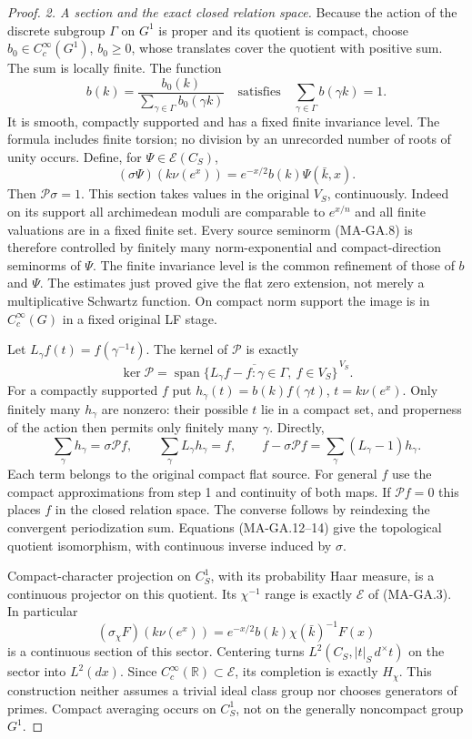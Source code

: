 \begin{proof}
\emph{2. A section and the exact closed relation space.}
Because the action of the discrete subgroup $\Gamma$ on
$G^1$ is proper and its quotient is compact, choose
$b_0\in C_c^\infty(G^1)$, $b_0\geq0$, whose translates
cover the quotient with positive sum.  The sum is locally
finite.  The function
\[
 b(k)=\frac{b_0(k)}{\sum_{\gamma\in\Gamma}b_0(\gamma k)}
 \quad\text{satisfies}\quad
       \sum_{\gamma\in\Gamma}b(\gamma k)=1.
 \tag{MA-GA.11}
\]
It is smooth, compactly supported and has a fixed finite
invariance level.  The formula includes finite torsion;
no division by an unrecorded number of roots of unity occurs.
Define, for $\Psi\in\mathcal E(C_S)$,
\[
 (\sigma\Psi)(k\nu(e^x))=e^{-x/2}b(k)\Psi(\bar k,x).
 \tag{MA-GA.12}
\]
Then $\mathcal P\sigma=1$.  This section takes values in
the original $V_S$, continuously.  Indeed on its support
all archimedean moduli are comparable to $e^{x/n}$ and all
finite valuations are in a fixed finite set.  Every source
seminorm (MA-GA.8) is therefore controlled by finitely many
norm-exponential and compact-direction seminorms of $\Psi$.
The finite invariance level is the common refinement of
those of $b$ and $\Psi$.  The estimates just proved give
the flat zero extension, not merely a multiplicative
Schwartz function.  On compact norm support the image is
in $C_c^\infty(G)$ in a fixed original LF stage.

Let $L_\gamma f(t)=f(\gamma^{-1}t)$.  The kernel of
$\mathcal P$ is exactly
\[
 \ker\mathcal P
     =\overline{\operatorname{span}
          \{L_\gamma f-f:\gamma\in\Gamma,\ f\in V_S\}}^{\,V_S}.
 \tag{MA-GA.13}
\]
For a compactly supported $f$ put
$h_\gamma(t)=b(k)f(\gamma t)$, $t=k\nu(e^x)$.
Only finitely many $h_\gamma$ are nonzero: their possible
$t$ lie in a compact set, and properness of the action
then permits only finitely many $\gamma$.  Directly,
\[
 \sum_\gamma h_\gamma=\sigma\mathcal P f,
 \qquad
 \sum_\gamma L_\gamma h_\gamma=f,
 \qquad
 f-\sigma\mathcal P f
          =\sum_\gamma(L_\gamma-1)h_\gamma.
 \tag{MA-GA.14}
\]
Each term belongs to the original compact flat source.
For general $f$ use the compact approximations from step 1
and continuity of both maps.  If $\mathcal P f=0$ this
places $f$ in the closed relation space.  The converse
follows by reindexing the convergent periodization sum.
Equations (MA-GA.12--14) give the topological quotient
isomorphism, with continuous inverse induced by $\sigma$.

Compact-character projection on $C_S^1$, with its probability
Haar measure, is a continuous projector on this quotient.
Its $\chi^{-1}$ range is exactly $\mathcal E$ of (MA-GA.3).
In particular
\[
 (\sigma_\chi F)(k\nu(e^x))
       =e^{-x/2}b(k)\chi(\bar k)^{-1}F(x)
 \tag{MA-GA.15}
\]
is a continuous section of this sector.  Centering turns
$L^2(C_S,|t|_S\,d^\times t)$ on the sector into $L^2(dx)$.
Since $C_c^\infty(\mathbb R)\subset\mathcal E$, its completion
is exactly $H_\chi$.  This construction neither assumes a
trivial ideal class group nor chooses generators of primes.
Compact averaging occurs on $C_S^1$, not on the generally
noncompact group $G^1$.


\end{proof}
